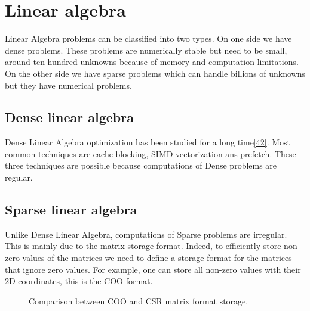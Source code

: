 \section{Linear algebra}

Linear Algebra problems can be classified into two types.
On one side we have dense problems.
These problems are numerically stable but need to be small,
around ten hundred unknowns because of memory and computation limitations.
On the other side we have sparse problems which can handle billions of unknowns
but they have numerical problems.


\subsection{Dense linear algebra}
Dense Linear Algebra optimization has been studied for a long time\ref{42}.
Most common techniques are cache blocking, SIMD vectorization ans prefetch.
These three techniques are possible because computations of Dense problems
are regular.

\subsection{Sparse linear algebra}
Unlike Dense Linear Algebra, computations of Sparse problems are irregular.
This is mainly due to the matrix storage format.
Indeed, to efficiently store non-zero values of the matrices we need to define
a storage format for the matrices that ignore zero values.
For example, one can store all non-zero values with their 2D coordinates, this
is the COO format.


\begin{figure}[!ht]
     \begin{center}
    \end{center}
    \caption{Comparison between COO and CSR matrix format storage.}
    \label{fig:matrix_storage}
\end{figure}
